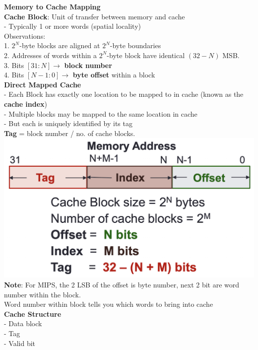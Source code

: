 \documentclass[10pt, a4paper]{article}
\newcommand{\highlight}[1]{{\color{red}\textbf{#1}}}
\begin{document}
\begin{multicols*}{3}
		\textbf{Memory to Cache Mapping}\\
		\highlight{Cache Block}: Unit of transfer between memory and cache\\
		- Typically 1 or more words (spatial locality)\\

		Observations:\\
		1. $2^{N}$-byte blocks are aligned at $2^{N}$-byte boundaries\\
		2. Addresses of words within a $2^{N}$-byte block have identical $(32-N)$ MSB.\\
		3. Bits $[31:N] \rightarrow$ \highlight{block number}\\
		4. Bits $[N-1:0] \rightarrow$ \highlight{byte offset} within a block\\

		\textbf{Direct Mapped Cache}\\
		- Each Block has exactly one location to be mapped to in cache (known as the \highlight{cache index})\\
		- Multiple blocks may be mapped to the same location in cache\\
		- But each is uniquely identified by its tag\\
		\highlight{Tag} = block number / no. of cache blocks.\\

		\includegraphics[scale=.3]{./assets/DirectCacheBits}\\
		\highlight{Note}: For MIPS, the 2 LSB of the offset is byte number, next 2 bit are word number within the block.\\
		Word number within block tells you which words to bring into cache\\

		\textbf{Cache Structure}\\
		- Data block\\
		- Tag\\
		- Valid bit\\


\end{multicols*}
\end{document}
